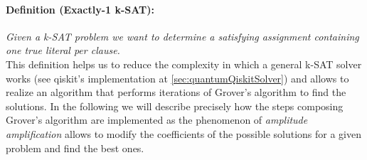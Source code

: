 \documentclass[english]{article}
\begin{document}
				\paragraph{Definition (Exactly-1 k-SAT):} \emph{Given a k-SAT problem we want to determine a satisfying assignment containing one true literal per clause.} \\
				
				This definition helps us to reduce the complexity in which a general k-SAT solver works (see qiskit's implementation at \ref{sec:quantumQiskitSolver}) and allows to realize an algorithm that performs iterations of Grover's algorithm to find the solutions. In the following we will describe precisely how the steps composing Grover's algorithm are implemented as the phenomenon of \emph{amplitude amplification} allows to modify the coefficients of the possible solutions for a given problem and find the best ones. \\
				
\end{document}
